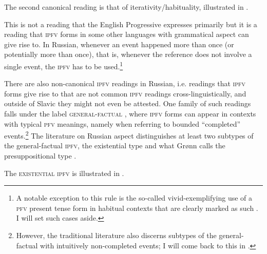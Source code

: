 \documentclass[output=paper]{langscibook}
\begin{document}
\label{gehr:ex:process}			
\z

\noindent The second canonical reading is that of iterativity/habituality, illustrated in .  

\label{gehr:ex:hab}			
\z 

\noindent This is not a reading that the English Progressive expresses primarily but it is a reading that \textsc{ipfv} forms in some other languages with grammatical aspect can give rise to. In Russian, whenever an event happened more than once (or potentially more than once), that is, whenever the reference does not involve a single event, the \textsc{ipfv} has to be used.\footnote{\label{gehr:fn:vivid}A notable exception to this rule is the so-called vivid-exemplifying use of a \textsc{pfv} present tense form in habitual contexts that are clearly marked as such \citep[see][]{zaliznjaksmelev}. I will set such cases aside.} 

There are also non-canonical \textsc{ipfv} readings in Russian, i.e. readings that \textsc{ipfv} forms give rise to that are not common \textsc{ipfv} readings cross-linguistically, and outside of Slavic they might not even be attested. One family of such readings falls under the label \textsc{general-factual} \citep[\textit{obščefaktičeskoe}, after][]{maslov59}, where \textsc{ipfv} forms can appear in contexts with typical \textsc{pfv} meanings, namely when referring to bounded ``completed'' events.\footnote{However, the traditional literature also discerns subtypes of the general-factual with intuitively non-completed events; I will come back to this in .} The literature on Russian aspect distinguishes at least two subtypes of the general-factual \textsc{ipfv}, the existential type \citep[][]{paduceva96, gronndiss} and what Grønn calls the presuppositional type \citep[``actional'' in][]{paduceva96}. 

The \textsc{existential ipfv} is illustrated in  \citep[corpus example from][]{gronndiss}.
\end{document}
